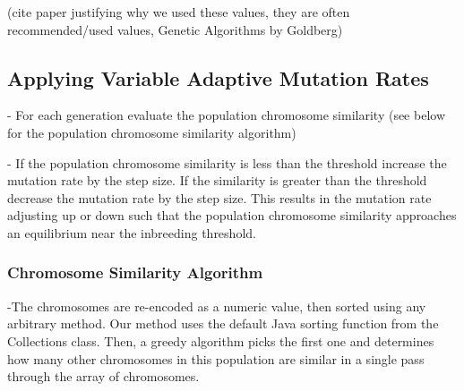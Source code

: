 \documentclass{sig-alternate}
\begin{document}
(cite paper justifying why we used these values, they are often recommended/used values, Genetic Algorithms by Goldberg)


\subsection{Applying Variable Adaptive Mutation Rates}

  - For each generation evaluate the population chromosome similarity (see below
    for the population chromosome similarity algorithm)

  - If the population chromosome similarity is less than the threshold increase
    the mutation rate by the step size. If the similarity is greater than the
    threshold decrease the mutation rate by the step size. This results in
    the mutation rate adjusting up or down such that the population chromosome
    similarity approaches an equilibrium near the inbreeding threshold.

\subsubsection{Chromosome Similarity Algorithm}
-The chromosomes are re-encoded as a numeric value, then sorted using any arbitrary method. Our method uses the default Java sorting function from the Collections class. Then, a greedy algorithm picks the first one and determines how many other chromosomes in this population are similar in a single pass through the array of chromosomes.
\end{document}
